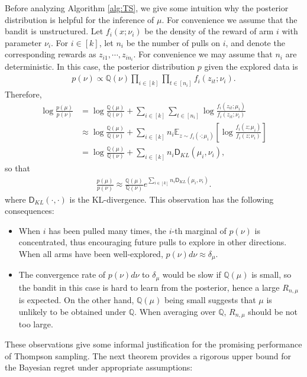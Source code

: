 \documentclass[letterpaper,10pt,openright,openany]{book}
\numberwithin{equation}{section}
\theoremstyle{plain}
\theoremstyle{definition}
\def\Q{{\mathbb Q}}
\def\E{{\mathbb E}}
\begin{document}
Before analyzing Algorithm \ref{alg:TS}, we give some intuition why the posterior distribution is helpful for the inference of $\mu$. For convenience we assume that the bandit is unstructured. Let $f_i(x;\nu_i)$ be the density of the reward of arm $i$ with parameter $\nu_i$. For $i\in [k]$, let $n_i$ be the number of pulls on $i$, and denote the corresponding rewards as $z_{i1}, \cdots, z_{in_i}$. For convenience we may assume that $n_i$ are deterministic. In this case, the posterior distribution $p$ given the explored data is
\begin{align*}
p(\nu)\propto\Q(\nu)\prod_{i\in [k]}\prod_{t\in [n_i]}f_i(z_{it};\nu_i).
\end{align*}
Therefore, 
\begin{align*}
\log\frac{p(\mu)}{p(\nu)} &= \log\frac{\Q(\mu)}{\Q(\nu)}+\sum_{i\in [k]}\sum_{t\in [n_i]}\log\frac{f_i(z_{it};\mu_i)}{f_i(z_{it};\nu_i)}\\
& \approx \log\frac{\Q(\mu)}{\Q(\nu)}+\sum_{i\in [k]}n_i\E_{z\sim f_i(\cdot; \mu_i)}\left[\log\frac{f_i(z;\mu_i)}{f_i(z;\nu_i)}\right]\\
& =  \log\frac{\Q(\mu)}{\Q(\nu)}+\sum_{i\in [k]}n_i\mathsf D_{KL}(\mu_i, \nu_i),
\end{align*}
so that
\begin{align*}
\frac{p(\mu)}{p(\nu)} \approx \frac{\Q(\mu)}{\Q(\nu)}e^{\sum_{i\in [k]}n_i\mathsf D_{KL}(\mu_i, \nu_i)}.
\end{align*}
where $\mathsf D_{KL}(\cdot, \cdot)$ is the KL-divergence. This observation has the following consequences:
\begin{itemize}
\item When $i$ has been pulled many times, the $i$-th marginal of $p(\nu)$ is concentrated, thus encouraging future pulls to explore in other directions. When all arms have been well-explored, $p(\nu)d\nu\approx\delta_{\mu}$.

\item The convergence rate of $p(\nu)d\nu$ to $\delta_{\mu}$ would be slow if $\Q(\mu)$ is small, so the bandit in this case is hard to learn from the posterior, hence a large $R_{n,\mu}$ is expected. On the other hand, $\Q(\mu)$ being small suggests that $\mu$ is unlikely to be obtained under $\Q$. When averaging over $\Q$, $R_{n,\mu}$ should be not too large. 
\end{itemize}

These observations give some informal justification for the promising performance of Thompson sampling. The next theorem provides a rigorous upper bound for the Bayesian regret under appropriate assumptions:
\end{document}
